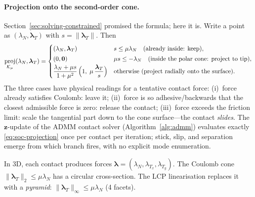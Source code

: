 \documentclass[11pt,twoside]{report}
\theoremstyle{definition}
\theoremstyle{plain}
\theoremstyle{remark}
\newcommand{\0}{\bm{0}}
\newcommand{\Kc}{\mathcal{K}}
\DeclareMathOperator{\proj}{proj}
\begin{document}
\paragraph{Projection onto the second-order cone.}
Section~\ref{sec:solving-constrained} promised the formula; here it is.
Write a point as $(\lambda_{N},\bm{\lambda}_{T})$ with
$s=\|\bm{\lambda}_{T}\|$. Then
\begin{equation}\label{eq:soc-projection}
\proj_{\Kc_{\mu}}(\lambda_{N},\bm{\lambda}_{T})=
\begin{cases}
(\lambda_{N},\bm{\lambda}_{T}) & s\le\mu\lambda_{N}
\quad\text{(already inside: keep)},\\[2pt]
(0,\0) & \mu s\le-\lambda_{N}
\quad\text{(inside the polar cone: project to tip)},\\[2pt]
\dfrac{\lambda_{N}+\mu s}{1+\mu^{2}}\,
\Bigl(1,\;\mu\,\dfrac{\bm{\lambda}_{T}}{s}\Bigr)
& \text{otherwise (project radially onto the surface)}.
\end{cases}
\end{equation}
The three cases have physical readings for a tentative contact force:
(i)~force already satisfies Coulomb: leave it;
(ii)~force is so adhesive/backwards that the closest admissible force is
zero: release the contact;
(iii)~force exceeds the friction limit: scale the tangential part down
to the cone surface---the contact \emph{slides}.
The $\bm{z}$-update of the ADMM contact solver
(Algorithm~\ref{alg:admm}) evaluates exactly
\eqref{eq:soc-projection} once per contact per iteration; stick, slip,
and separation emerge from which branch fires, with no explicit mode
enumeration.

\begin{examplebox}
In 3D, each contact produces forces $\bm{\lambda}=(\lambda_{N},\lambda_{T_{x}},\lambda_{T_{y}})$.
The Coulomb cone $\|\bm{\lambda}_{T}\|_{2}\le\mu\lambda_{N}$ has a circular cross-section.
The LCP linearisation replaces it with a \emph{pyramid}: $\|\bm{\lambda}_{T}\|_{\infty}\le\mu\lambda_{N}$ (4 facets).
\end{examplebox}

\begin{center}
\end{center}
\end{document}
